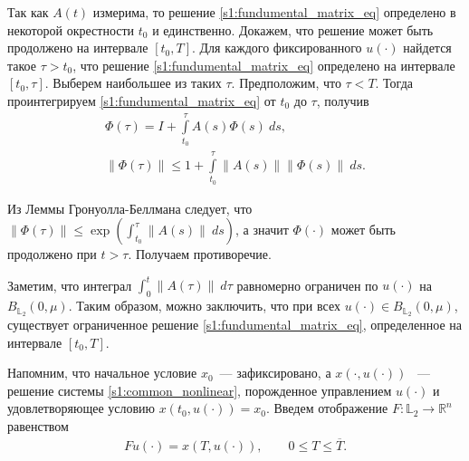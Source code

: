 \documentclass[../main.tex]{subfiles}
\begin{document}
Так как $A(t)$ измерима, то решение \eqref{s1:fundumental_matrix_eq} определено в некоторой окрестности $t_0$ и единственно\cite[с. 46]{Fillipov2}. 
Докажем, что решение может быть продолжено на интервале $[t_0, T]$. 
Для каждого фиксированного  $u(\cdot) $ найдется такое $\tau > t_0$, что решение \eqref{s1:fundumental_matrix_eq} определено на интервале $ [t_0, \tau] $.
Выберем наибольшее из таких $\tau$.
Предположим, что $\tau < T$. 
Тогда проинтегрируем \eqref{s1:fundumental_matrix_eq} от $t_0$ до $\tau$, получив
\begin{gather*}
    \Phi(\tau) = I + \int\limits_{t_0}^{\tau} A(s)  \Phi(s) \ ds, \\
    \| \Phi(\tau) \| \leqslant 1 +  \int\limits_{t_0}^{\tau} \| A(s)\| \|\Phi(s)\| \ ds.
\end{gather*}

Из Леммы Гронуолла-Беллмана следует, что  $ \| \Phi(\tau) \| \leqslant \exp \left( \int_{t_0}^{\tau}  \| A(s)\| \ ds \right)$, а значит $\Phi(\cdot)$ может быть продолжено при $t > \tau$. 
Получаем противоречие.

Заметим, что интеграл $\int_0^t \| A(\tau)\|  \ d\tau$ равномерно ограничен по $u(\cdot) $ на $  B_{\mathbb{L}_2}(0,\mu)$.
Таким образом, можно заключить,  что при всех $u(\cdot) \in  B_{\mathbb{L}_2}(0,\mu)$, существует ограниченное решение  \eqref{s1:fundumental_matrix_eq}, определенное на интервале $[t_0, T]$.
    
    
Напомним, что начальное условие $x_0 $~--- зафиксировано, а $ x(\cdot,u(\cdot))$ ~--- решение системы \eqref{s1:common_nonlinear},  порожденное управлением $u(\cdot)$ и удовлетворяющее условию $x(t_0, u(\cdot)) = x_0$. 
Введем отображение $F: \mathbb{L}_2 \rightarrow \mathbb{R}^n $ равенством 
\begin{gather}\label{s1:solution_endpoint_mapping}
    Fu(\cdot) = x(T,u(\cdot)), \qquad 0 \leqslant T \leqslant \overline{T}.
\end{gather} 
    
\end{document}

